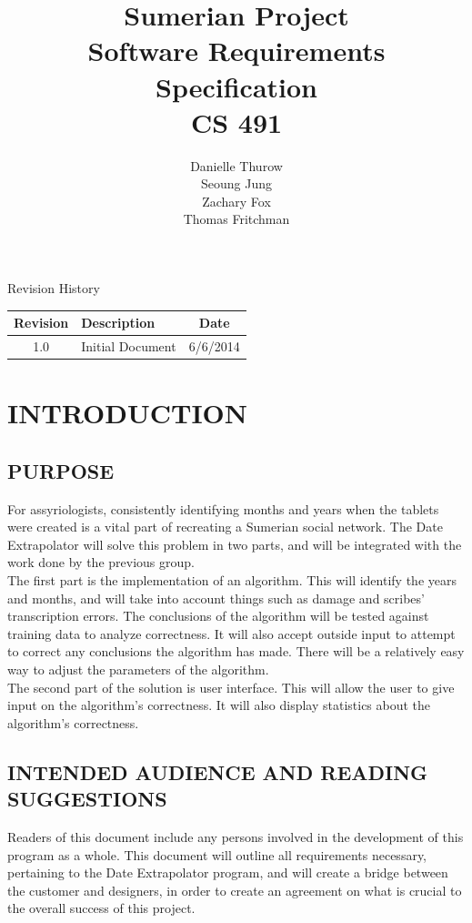 \documentclass[11pt]{article}
\title{Sumerian Project\\
Software Requirements Specification\\
CS 491}
\author{Danielle Thurow \\
Seoung Jung\\
Zachary Fox\\
Thomas Fritchman}
\date{}
\begin{document}
\maketitle
\newpage

\tableofcontents
\newpage

\begin{center}
\Large Revision History\\
\begin{tabularx}{\textwidth}{|c|X|c|}
    \hline
    \textbf{Revision} & \textbf{Description} & \textbf{Date}\\ \hline
    1.0 & Initial Document & 6/6/2014\\ \hline
\end{tabularx}
\end{center}
\newpage

\section{INTRODUCTION}
\subsection{PURPOSE}
For assyriologists, consistently identifying months and years when the tablets were created is a vital part of recreating a Sumerian social network. The Date Extrapolator will solve this problem in two parts, and will be integrated with the work done by the previous group.\\

The first part is the implementation of an algorithm. This will identify the years and months, and will take into account things such as damage and scribes’ transcription errors. The conclusions of the algorithm will be tested against training data to analyze correctness. It will also accept outside input to attempt to correct any conclusions the algorithm has made. There will be a relatively easy way to adjust the parameters of the algorithm.\\

The second part of the solution is user interface. This will allow the user to give input on the algorithm’s correctness. It will also display statistics about the algorithm’s correctness.

\subsection{INTENDED AUDIENCE AND READING SUGGESTIONS}
Readers of this document include any persons involved in the development of this program as a whole. This document will outline all requirements necessary, pertaining to the Date Extrapolator program, and will create a bridge between the customer and designers, in order to create an agreement on what is crucial to the overall success of this project. 
\end{document}
